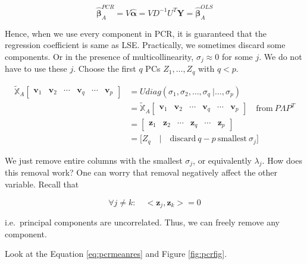 \documentclass[]{book}
\theoremstyle{definition}
\theoremstyle{definition}
\theoremstyle{definition}
\theoremstyle{remark}
\begin{document}
\begin{equation}
  \boldsymbol{\hat\beta}_{A}^{PCR} = V \hat{\boldsymbol\alpha} = VD^{-1}U^T \mathbf{Y} = \boldsymbol{\hat\beta}_{A}^{OLS}
  \label{eq:pcrlse}
\end{equation}

Hence, when we use every component in PCR, it is guaranteed that the regression coefficient is same as LSE. Practically, we sometimes discard some components. Or in the presence of multicollinearity, \(\sigma_j \approx 0\) for some \(j\). We do not have to use these \(j\). Choose the first \(q\) PCs \(Z_1, \ldots, Z_q\) with \(q < p\).

\begin{equation}
  \begin{split}
    \widetilde{\mathbb{X}}_A \left[\begin{array}{cccc|cc}
      \mathbf{v}_1 & \mathbf{v}_2 & \cdots & \mathbf{v}_q & \cdots & \mathbf{v}_p
    \end{array}\right] & = U diag(\sigma_1, \sigma_2, \ldots, \sigma_q \: \bigg\vert \ldots, \sigma_p ) \\
    & = \widetilde{\mathbb{X}}_A \left[\begin{array}{cccc|cc}
      \mathbf{v}_1 & \mathbf{v}_2 & \cdots & \mathbf{v}_q & \cdots & \mathbf{v}_p
    \end{array}\right] \quad \text{from}\: P\Lambda P^T \\
    & = \left[\begin{array}{cccc|cc}
      \mathbf{z}_1 & \mathbf{z}_2 & \cdots & \mathbf{z}_q & \cdots & \mathbf{z}_p
    \end{array}\right] \\
    & = \Big[ Z_q \quad \Big\vert \quad \text{discard}\: q - p \: \text{smallest}\: \sigma_j \Big]
  \end{split}
  \label{eq:pcrdimred}
\end{equation}

We just remove entire columns with the smallest \(\sigma_j\), or equivalently \(\lambda_j\). How does this removal work? One can worry that removal negatively affect the other variable. Recall that

\[\forall j \neq k : \quad <\mathbf{z}_j, \mathbf{z}_k> = 0\]

i.e.~principal components are uncorrelated. Thus, we can freely remove any component.

Look at the Equation \eqref{eq:pcrmeanres} and Figure \ref{fig:pcrfig}.
\end{document}
